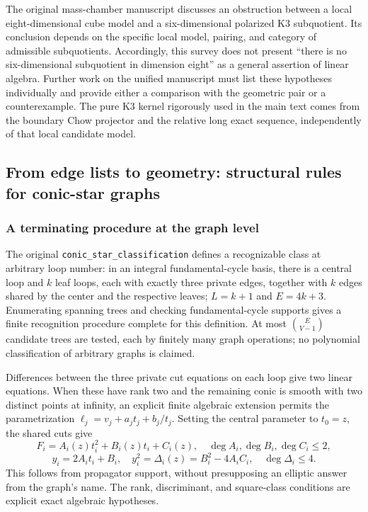 \documentclass[11pt,a4paper,oneside]{article}
\theoremstyle{plain}
\theoremstyle{definition}
\theoremstyle{remark}
\newcommand{\Q}{\mathbb Q}
\newcommand{\im}{\operatorname{im}}
\newcommand{\dR}{\mathrm{dR}}
\numberwithin{equation}{section}
\begin{document}
The original mass-chamber manuscript discusses an obstruction between a local eight-dimensional cube model and a six-dimensional polarized K3 subquotient. Its conclusion depends on the specific local model, pairing, and category of admissible subquotients. Accordingly, this survey does not present ``there is no six-dimensional subquotient in dimension eight'' as a general assertion of linear algebra. Further work on the unified manuscript must list these hypotheses individually and provide either a comparison with the geometric pair or a counterexample. The pure K3 kernel rigorously used in the main text comes from the boundary Chow projector and the relative long exact sequence, independently of that local candidate model.


\endgroup

\begingroup
\providecommand{\Q}{\mathbb Q}\providecommand{\cC}{\mathcal C}
\providecommand{\cS}{\mathcal S}\providecommand{\dR}{\mathrm{dR}}
\providecommand{\rk}{\operatorname{rk}}\providecommand{\im}{\operatorname{im}}
\subsection{From edge lists to geometry: structural rules for conic-star graphs}
\subsubsection{A terminating procedure at the graph level}
The original \nolinkurl{conic_star_classification} defines a recognizable class at arbitrary loop number:
in an integral fundamental-cycle basis, there is a central loop and $k$ leaf loops, each with exactly three private edges,
together with $k$ edges shared by the center and the respective leaves; $L=k+1$ and $E=4k+3$.
Enumerating spanning trees and checking fundamental-cycle supports gives a finite recognition procedure complete for this definition.
At most $\binom{E}{V-1}$ candidate trees are tested, each by finitely many graph operations;
no polynomial classification of arbitrary graphs is claimed.

Differences between the three private cut equations on each loop give two linear equations.
When these have rank two and the remaining conic is smooth with two distinct points at infinity,
an explicit finite algebraic extension permits the parametrization $\ell_j=v_j+a_jt_j+b_j/t_j$.
Setting the central parameter to $t_0=z$, the shared cuts give
\[
 F_i=A_i(z)t_i^2+B_i(z)t_i+C_i(z),\quad
 \deg A_i,\deg B_i,\deg C_i\leq2,
\]
\[
 y_i=2A_it_i+B_i,\quad y_i^2=\Delta_i(z)=B_i^2-4A_iC_i,\quad
 \deg\Delta_i\leq4.
\]
This follows from propagator support, without presupposing an elliptic answer from the graph's name.
The rank, discriminant, and square-class conditions are explicit exact algebraic hypotheses.
\end{document}
